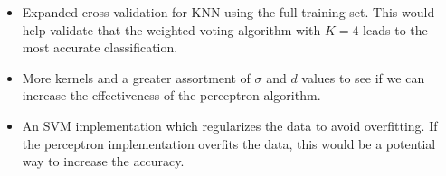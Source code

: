\documentclass{article} %
\begin{document}
\begin{itemize}
\item Expanded cross validation for KNN using the full training set. This would
  help validate that the weighted voting algorithm with $K = 4$ leads to the
  most accurate classification. 
\item More kernels and a greater assortment of $\sigma$ and $d$ values to
  see if we can increase the effectiveness of the perceptron algorithm. 
\item An SVM implementation which regularizes the data to avoid overfitting. If
  the perceptron implementation overfits the data, this would be a potential
  way to increase the accuracy.
\end{itemize}


\begingroup
\renewcommand{\section}[2]{}%

	
\endgroup
\end{document}
